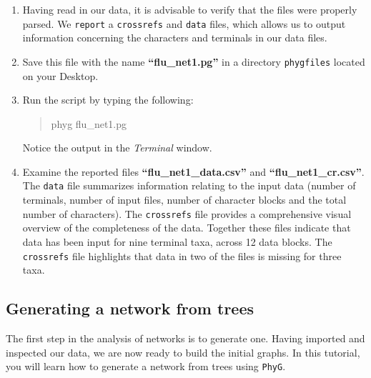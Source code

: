 \documentclass[11pt]{article}
\begin{document}
\begin{enumerate}
\item Having read in our data, it is advisable to verify that the files were properly 
parsed. We \texttt{report} a \texttt{crossrefs} and \texttt{data} files, which allows 
us to output information concerning the characters and terminals in our data files. 

\item Save this file with the name \textbf{``flu\_net1.pg''} in a directory \texttt{phygfiles} 
located on your Desktop.

\item Run the script by typing the following:

	\begin{quote}
  	phyg flu\_net1.pg
	\end{quote}

Notice the output in the \textit{Terminal} window. 

\item Examine the reported files \textbf{``flu\_net1\_data.csv''} and 
\textbf{``flu\_net1\_cr.csv''}. The \texttt{data} file summarizes information relating 
to the input data (number of terminals, number of input files, number of character 
blocks and the total number of characters). The \texttt{crossrefs} file provides a 
comprehensive visual overview of the completeness of the data. Together these 
files indicate that data has been input for nine terminal taxa, across 12 data 
blocks. The \texttt{crossrefs} file highlights that data in two of the files is missing 
for three taxa.

\end{enumerate}

\subsection{Generating a network from trees}
\label{subsec:makinganetwork}

The first step in the analysis of networks is to generate one. Having imported and 
inspected our data, we are now ready to build the initial graphs. In this tutorial, you 
will learn how to generate a network from trees using \texttt{PhyG}. 
\end{document}
